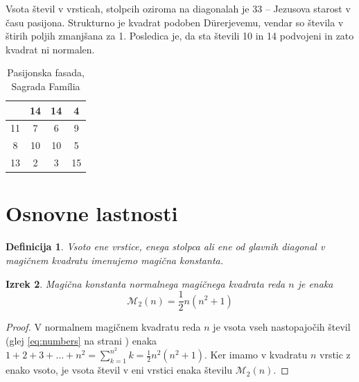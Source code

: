 \documentclass[a4paper,12pt]{article}
\newcommand{\m}{\mathcal}
\newtheorem{izrek}{Izrek}[section]
\newtheorem{definicija}[izrek]{Definicija}
\begin{document}
Vsota števil v vrsticah, stolpcih oziroma na diagonalah je 33 -- Jezusova starost
v času pasijona. Strukturno je kvadrat podoben Dürerjevemu, vendar so števila
v štirih poljih zmanjšana za 1. Posledica je, da sta števili 10 in 14 podvojeni
in zato kvadrat ni normalen.
%


\begin{table}
   \centering
   \caption{Pasijonska fasada, Sagrada Família}
   \label{table:sagrada}
   \begin{tabular}{|c|c|c|c|}}\hline
         1 & 14 & 14 &  4 \\\hline
         11 &  7 &  6 &  9 \\\hline
         8 & 10 & 10 &  5 \\\hline
         13 &  2 &  3 & 15 \\\hline
   \end{tabular}
\end{table}


\section{Osnovne lastnosti}

\begin{definicija}
      Vsoto ene vrstice, enega stolpca ali ene od glavnih diagonal
      v magičnem kvadratu imenujemo \emph{magična konstanta}.
\end{definicija}

\begin{izrek}
   Magična konstanta normalnega magičnega kvadrata reda  \(n \)
   je enaka
   \begin{equation}
      \label{eq:mc}
      \mathcal{M}_2(n) = \frac{1}{2} n(n^2+1)
   \end{equation}
\end{izrek}


\begin{proof}
      V normalnem magičnem kvadratu reda $n$ je vsota vseh nastopajočih
      števil (glej \ref{eq:numbers} na strani \pageref{eq:numbers}) enaka
      $1+2+3+\dots+n^2=\sum_{k=1}^{n^2}k=\frac{1}{2}n^2(n^2+1)$. Ker imamo
      v kvadratu $n$ vrstic z enako vsoto, je vsota števil v eni vrstici
      enaka številu $\m{M_2}(n)$. %
\end{proof}
\end{document}
